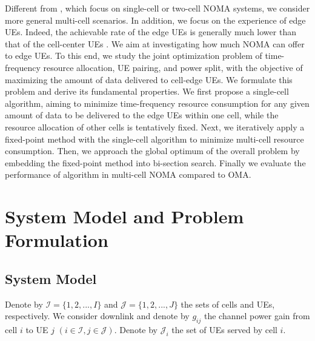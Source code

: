 \documentclass[10pt,journal,final,finalsubmission,twocolumn]{IEEEtran}
\begin{document}
Different from \cite{Do1, Do2, Guo, Pei}, which focus on single-cell or two-cell NOMA systems, we consider more general multi-cell scenarios. In addition, we focus on the experience of edge UEs. Indeed, the achievable rate of the edge UEs is generally much lower than that of the cell-center UEs \cite{Dai}. We aim at investigating how much NOMA can offer to edge UEs. To this end, we study the joint optimization problem of time-frequency resource allocation, UE pairing, and power split, with the objective of maximizing the amount of data delivered to cell-edge UEs. We formulate this problem and derive its fundamental properties. We first propose a single-cell algorithm, aiming to minimize time-frequency resource consumption for any given amount of data to be delivered to the edge UEs within one cell, while the resource allocation of other cells is tentatively fixed. Next, we iteratively apply a fixed-point method with the single-cell algorithm to minimize multi-cell resource consumption. Then, we approach the global optimum of the overall problem by embedding the fixed-point method into bi-section search. Finally we evaluate the performance of algorithm in multi-cell NOMA compared to OMA.

\section{System Model and Problem Formulation} \label{Sec:SystemModel}

\subsection{System Model}\label{Preliminaries}

Denote by $\mathcal{I} = \{1,2,...,I \}$ and $\mathcal{J} = \{1,2,...,J\}$ the sets of cells and UEs, respectively. 
We consider downlink and denote by $g_{ij}$ the channel power gain from cell $i$ to UE $j$ $(i \in \mathcal{I}, j \in \mathcal{J})$. Denote by $\mathcal{J}_i$ the set of UEs served by cell $i$.
\end{document}
